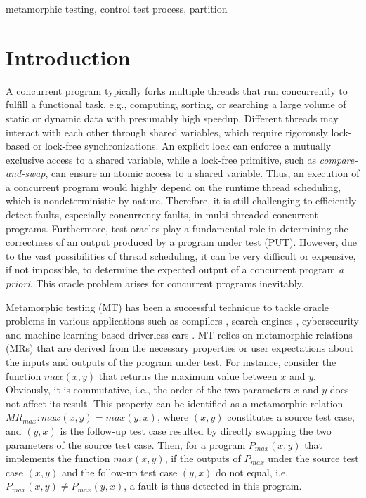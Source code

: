 \documentclass[conference]{IEEEtran}
\theoremstyle{remark}
\newcommand{\MR}{\textit{MR}}
\begin{document}
\begin{IEEEkeywords}
metamorphic testing, control test process, partition
\end{IEEEkeywords}

\section{Introduction}
\label{section:introduction}
A concurrent program typically forks multiple threads that run concurrently to fulfill a functional task, e.g., computing, sorting, or searching a large volume of static or dynamic data with presumably high speedup. Different threads may interact with each other through shared variables, which require rigorously lock-based or lock-free synchronizations. An explicit lock can enforce a mutually exclusive access to a shared variable, while a lock-free primitive, such as {\it compare-and-swap}, can ensure an atomic access to a shared variable. Thus, an execution of a concurrent program would highly depend on the runtime thread scheduling, which is nondeterministic by nature. Therefore, it is still challenging to efficiently detect faults, especially concurrency faults, in multi-threaded concurrent programs. Furthermore, test oracles \cite{weyuker1982testing} play a fundamental role in determining the correctness of an output produced by a program under test (PUT). However, due to the vast possibilities of thread scheduling, it can be very difficult or expensive, if not impossible, to determine the expected output of a concurrent program \textit{a priori}. This oracle problem \cite{barr2015oracle, patel2018mapping} arises for concurrent programs inevitably.

Metamorphic testing (MT) \cite{chen1998metamorphic, chen2018metamorphic} has been a successful technique to tackle oracle problems in various applications such as compilers \cite{LAS14}, search engines \cite{7254235}, cybersecurity \cite{CKMSTVZ6} and machine learning-based driverless cars \cite{ZS19}. MT relies on metamorphic relations (MRs) that are derived from the necessary properties or user expectations about the inputs and outputs of the program under test. For instance, consider the function $max(x,y)$ that returns the maximum value between $x$ and $y$. Obviously, it is commutative, i.e., the order of the two parameters $x$ and $y$ does not affect its result. This property can be identified as a metamorphic relation $\MR_{max}: max(x,y) = max(y,x)$, where $(x,y)$ constitutes a source test case, and $(y,x)$ is the follow-up test case resulted by directly swapping the two parameters of the source test case. Then, for a program $P_{max}(x,y)$ that implements the function $max(x,y)$, if the outputs of $P_{max}$ under the source test case $(x,y)$ and the follow-up test case $(y,x)$ do not equal, i.e, $P_{max}(x,y)\neq P_{max}(y,x)$, a fault is thus detected in this program.
\end{document}
